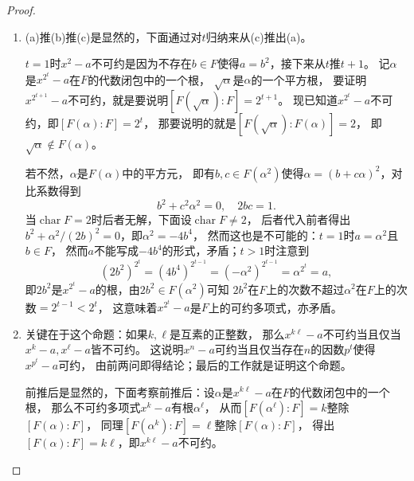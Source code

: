 \begin{enumerate}
\begin{proof}
\begin{enumerate}[label=(\arabic*)]
    接着是从$t$推$t+1$，也就是说，设$x^{p^t}-a$不可约，
    要说明$x^{p^{t+1}}-a$不可约。记$\beta$是$\alpha$的一个$p^{t-1}$次方根，
    $\sqrt[p]{\beta}$是$\beta$的一个$p$次方根，
    要证明$x^{p^{t+1}}-a$不可约，就是要说明$[F(\sqrt[p]{\beta}):F]=p^{t+1}$。
    
    对于\textbf{域$F(\alpha)$}用$t$时的归纳假设，
    $\sqrt[p]{\alpha} \notin F(\alpha)$表明
    $x^{p^t}-\alpha$是$F(\alpha)$上的不可约多项式。
    注意到$\big(\sqrt[p]{\beta}\big)^{p^t}=\beta^{p^{t-1}}=\alpha$，
    即$\sqrt[p]{\beta}$为$x^{p^t}-\alpha$的根，
    从而$[F(\sqrt[p]{\beta}):F(\alpha)]=p^t$。
    乘以$[F(\alpha):F]=p$，就得出$[F(\sqrt[p]{\beta}):F]=p^{t+1}$。
    \item (a)推(b)推(c)是显然的，下面通过对$t$归纳来从(c)推出(a)。
    
    $t=1$时$x^2-a$不可约是因为不存在$b \in F$使得$a=b^2$，接下来从$t$推$t+1$。
    记$\alpha$是$x^{2^t}-a$在$F$的代数闭包中的一个根，
    $\sqrt{\alpha}$是$\alpha$的一个平方根，
    要证明$x^{2^{t+1}}-a$不可约，就是要说明$[F(\sqrt{\alpha}):F]=2^{t+1}$。
    现已知道$x^{2^t}-a$不可约，即$[F(\alpha):F]=2^t$，
    那要说明的就是$[F(\sqrt{\alpha}):F(\alpha)]=2$，
    即$\sqrt{\alpha} \notin F(\alpha)$。
    
    若不然，$\alpha$是$F(\alpha)$中的平方元，
    即有$b,c \in F(\alpha^2)$使得$\alpha=(b+c\alpha)^2$，对比系数得到
    \[b^2+c^2\alpha^2=0,\quad2bc=1.\]
    当$\operatorname{char}F=2$时后者无解，下面设$\operatorname{char}F\ne2$，
    后者代入前者得出$b^2+\alpha^2/(2b)^2=0$，即$\alpha^2=-4b^4$，
    然而这也是不可能的：$t=1$时$a=\alpha^2$且$b \in F$，
    然而$a$不能写成$-4b^4$的形式，矛盾；$t>1$时注意到
    \[(2b^2)^{2^t}=(4b^4)^{2^{t-1}}=(-\alpha^2)^{2^{t-1}}=\alpha^{2^t}=a,\]
    即$2b^2$是$x^{2^t}-a$的根，由$2b^2 \in F(\alpha^2)$可知
    $2b^2$在$F$上的次数不超过$\alpha^2$在$F$上的次数$=2^{t-1}<2^t$，
    这意味着$x^{2^t}-a$是$F$上的可约多项式，亦矛盾。
    \item 关键在于这个命题：如果$k,\ell$是互素的正整数，
    那么$x^{k\ell}-a$不可约当且仅当$x^k-a,x^\ell-a$皆不可约。
    这说明$x^n-a$可约当且仅当存在$n$的因数$p^t$使得$x^{p^t}-a$可约，
    由前两问即得结论；最后的工作就是证明这个命题。
    
    前推后是显然的，下面考察前推后：设$\alpha$是$x^{k\ell}-a$在$F$的代数闭包中的一个根，
    那么不可约多项式$x^k-a$有根$\alpha^\ell$，
    从而$[F(\alpha^\ell):F]=k$整除$[F(\alpha):F]$，
    同理$[F(\alpha^k):F]=\ell$整除$[F(\alpha):F]$，
    得出$[F(\alpha):F]=k\ell$，即$x^{k\ell}-a$不可约。\qedhere
\end{enumerate}
\end{proof}
\end{enumerate}

